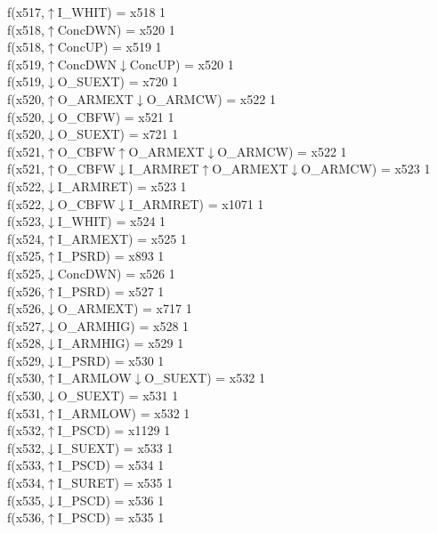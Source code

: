 f(x517,$\uparrow$I\_WHIT) = x518 {1} \\
f(x518,$\uparrow$ConcDWN) = x520 {1} \\
f(x518,$\uparrow$ConcUP) = x519 {1} \\
f(x519,$\uparrow$ConcDWN$\downarrow$ConcUP) = x520 {1} \\
f(x519,$\downarrow$O\_SUEXT) = x720 {1} \\
f(x520,$\uparrow$O\_ARMEXT$\downarrow$O\_ARMCW) = x522 {1} \\
f(x520,$\downarrow$O\_CBFW) = x521 {1} \\
f(x520,$\downarrow$O\_SUEXT) = x721 {1} \\
f(x521,$\uparrow$O\_CBFW$\uparrow$O\_ARMEXT$\downarrow$O\_ARMCW) = x522 {1} \\
f(x521,$\uparrow$O\_CBFW$\downarrow$I\_ARMRET$\uparrow$O\_ARMEXT$\downarrow$O\_ARMCW) = x523 {1} \\
f(x522,$\downarrow$I\_ARMRET) = x523 {1} \\
f(x522,$\downarrow$O\_CBFW$\downarrow$I\_ARMRET) = x1071 {1} \\
f(x523,$\downarrow$I\_WHIT) = x524 {1} \\
f(x524,$\uparrow$I\_ARMEXT) = x525 {1} \\
f(x525,$\uparrow$I\_PSRD) = x893 {1} \\
f(x525,$\downarrow$ConcDWN) = x526 {1} \\
f(x526,$\uparrow$I\_PSRD) = x527 {1} \\
f(x526,$\downarrow$O\_ARMEXT) = x717 {1} \\
f(x527,$\downarrow$O\_ARMHIG) = x528 {1} \\
f(x528,$\downarrow$I\_ARMHIG) = x529 {1} \\
f(x529,$\downarrow$I\_PSRD) = x530 {1} \\
f(x530,$\uparrow$I\_ARMLOW$\downarrow$O\_SUEXT) = x532 {1} \\
f(x530,$\downarrow$O\_SUEXT) = x531 {1} \\
f(x531,$\uparrow$I\_ARMLOW) = x532 {1} \\
f(x532,$\uparrow$I\_PSCD) = x1129 {1} \\
f(x532,$\downarrow$I\_SUEXT) = x533 {1} \\
f(x533,$\uparrow$I\_PSCD) = x534 {1} \\
f(x534,$\uparrow$I\_SURET) = x535 {1} \\
f(x535,$\downarrow$I\_PSCD) = x536 {1} \\
f(x536,$\uparrow$I\_PSCD) = x535 {1} \\
